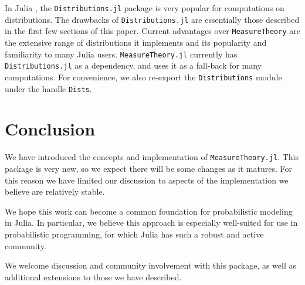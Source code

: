 \documentclass{juliacon}
\begin{document}
In Julia \cite{bezanson2017julia}, the \verb|Distributions.jl| package \cite{Distributions.jl-2019} is very popular for computations on distributions. The drawbacks of \verb|Distributions.jl| are essentially those described in the first few sections of this paper. 
Current advantages over \verb|MeasureTheory| are the extensive range of distributions it implements and its popularity and familiarity to many Julia users. \verb|MeasureTheory.jl| currently has \verb|Distributions.jl| as a dependency, and uses it as a fall-back for many computations. For convenience, we also re-export the \verb|Distributions| module under the handle \verb|Dists|.








\section{Conclusion}

We have introduced the concepts and implementation of \verb|MeasureTheory.jl|. This package is very new, so we expect there will be some changes as it matures. For this reason we have limited our discussion to aspects of the implementation we believe are relatively stable.

We hope this work can become a common foundation for probabilistic modeling in Julia. In particular, we believe this approach is especially well-suited for use in probabilistic programming, for which Julia has such a robust and active community.

We welcome discussion and community involvement with this package, as well as additional extensions to those we have described.


\end{document}
